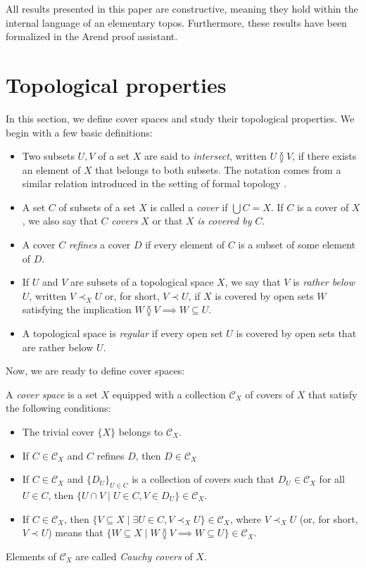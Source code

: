 \documentclass[pdflatex,sn-mathphys-num]{sn-jnl}
\newcommand{\axitem}[1]{\phantomsection \label{ax:#1}}
\theoremstyle{definition}
\theoremstyle{remark}
\numberwithin{figure}{section}
\newcommand{\overlap}[2]{#1 \between #2}
\newcommand{\rb}{\prec}
\begin{document}
All results presented in this paper are constructive, meaning they hold within the internal language of an elementary topos.
Furthermore, these results have been formalized in the Arend proof assistant.

\section{Topological properties}
\label{sec:top}

In this section, we define cover spaces and study their topological properties.
We begin with a few basic definitions:
\begin{itemize}
\item Two subsets $U,V$ of a set $X$ are said to \emph{intersect}, written $\overlap{U}{V}$, if there exists an element of $X$ that belongs to both subsets.
      The notation comes from a similar relation introduced in the setting of formal topology \cite{sambin-points}.
\item A set $C$ of subsets of a set $X$ is called a \emph{cover} if $\bigcup C = X$. If $C$ is a cover of $X$, we also say that $C$ \emph{covers} $X$ or that $X$ \emph{is covered by} $C$.
\item A cover $C$ \emph{refines} a cover $D$ if every element of $C$ is a subset of some element of $D$.
\item If $U$ and $V$ are subsets of a topological space $X$, we say that $V$ is \emph{rather below} $U$, written $V \rb_X U$ or, for short, $V \rb U$, if $X$ is covered by open sets $W$ satisfying the implication $\overlap{W}{V} \implies W \subseteq U$.
\item A topological space is \emph{regular} if every open set $U$ is covered by open sets that are rather below $U$.
\end{itemize}

Now, we are ready to define cover spaces:
\begin{defn}
A \emph{cover space} is a set $X$ equipped with a collection $\mathcal{C}_X$ of covers of $X$ that satisfy the following conditions:
\begin{itemize}[(CT)]
\item[(CT)] \axitem{CT} The trivial cover $\{ X \}$ belongs to $\mathcal{C}_X$.
\item[(CE)] \axitem{CE} If $C \in \mathcal{C}_X$ and $C$ refines $D$, then $D \in \mathcal{C}_X$
\item[(CG)] \axitem{CG} If $C \in \mathcal{C}_X$ and $\{ D_U \}_{U \in C}$ is a collection of covers such that $D_U \in \mathcal{C}_X$ for all $U \in C$,
            then $\{ U \cap V \mid U \in C, V \in D_U \} \in \mathcal{C}_X$.
\item[(CR)] \axitem{CR} If $C \in \mathcal{C}_X$, then $\{ V \subseteq X \mid \exists U \in C, V \rb_X U \} \in \mathcal{C}_X$,
            where $V \rb_X U$ (or, for short, $V \rb U$) means that $\{ W \subseteq X \mid \overlap{W}{V} \implies W \subseteq U \} \in \mathcal{C}_X$.
\end{itemize}
Elements of $\mathcal{C}_X$ are called \emph{Cauchy covers} of $X$.
\end{defn}
\end{document}
